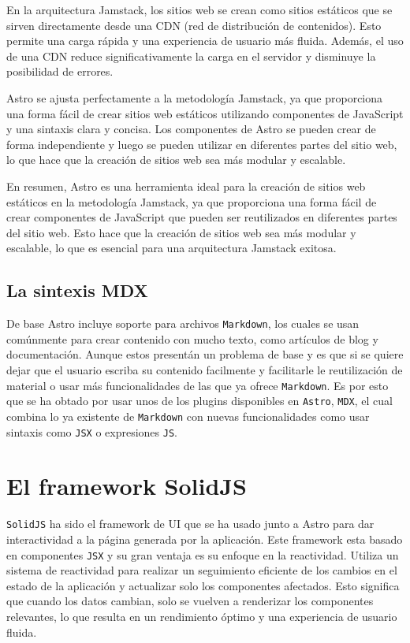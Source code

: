 En la arquitectura Jamstack, los sitios web se crean como sitios estáticos que se sirven directamente desde una CDN (red de distribución de contenidos). Esto permite una carga rápida y una experiencia de usuario más fluida. Además, el uso de una CDN reduce significativamente la carga en el servidor y disminuye la posibilidad de errores.

Astro se ajusta perfectamente a la metodología Jamstack, ya que proporciona una forma fácil de crear sitios web estáticos utilizando componentes de JavaScript y una sintaxis clara y concisa. Los componentes de Astro se pueden crear de forma independiente y luego se pueden utilizar en diferentes partes del sitio web, lo que hace que la creación de sitios web sea más modular y escalable.

En resumen, Astro es una herramienta ideal para la creación de sitios web estáticos en la metodología Jamstack, ya que proporciona una forma fácil de crear componentes de JavaScript que pueden ser reutilizados en diferentes partes del sitio web. Esto hace que la creación de sitios web sea más modular y escalable, lo que es esencial para una arquitectura Jamstack exitosa.

\subsection{La sintexis MDX}
De base Astro incluye soporte para archivos \verb|Markdown|\cite{md}, los cuales se usan comúnmente para crear contenido con mucho texto, como artículos de blog y documentación. Aunque estos presentán un problema de base y es que si se quiere dejar que el usuario escriba su contenido facilmente y facilitarle le reutilización de material o usar más funcionalidades de las que ya ofrece \verb|Markdown|\cite{md}. Es por esto que se ha obtado por usar unos de los plugins disponibles en \verb|Astro|\cite{astro}, \verb|MDX|\cite{mdx}, el cual combina lo ya existente de \verb|Markdown|\cite{md} con nuevas funcionalidades como usar sintaxis como \verb|JSX|\cite{jsx} o expresiones \verb|JS|\cite{js}.

\section{El framework SolidJS}
\verb|SolidJS|\cite{solid} ha sido el framework de UI que se ha usado junto a Astro para dar interactividad a la página generada por la aplicación. Este framework esta basado en componentes \verb|JSX|\cite{jsx} y su gran ventaja es su enfoque en la reactividad. Utiliza un sistema de reactividad para realizar un seguimiento eficiente de los cambios en el estado de la aplicación y actualizar solo los componentes afectados. Esto significa que cuando los datos cambian, solo se vuelven a renderizar los componentes relevantes, lo que resulta en un rendimiento óptimo y una experiencia de usuario fluida.


